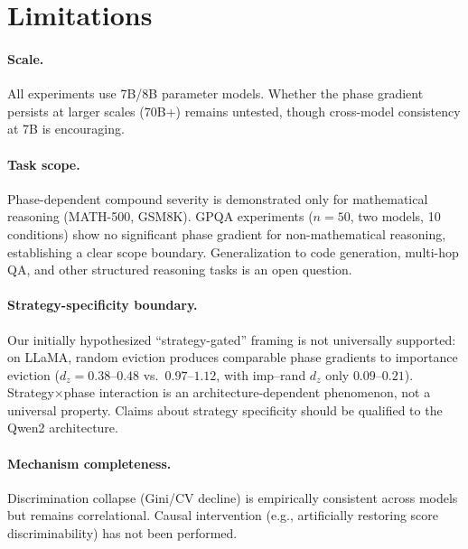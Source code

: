 \documentclass[11pt,a4paper]{article}
\begin{document}
\section*{Limitations}

\paragraph{Scale.} All experiments use 7B/8B parameter models. Whether the phase gradient persists at larger scales (70B+) remains untested, though cross-model consistency at 7B is encouraging.

\paragraph{Task scope.} Phase-dependent compound severity is demonstrated only for mathematical reasoning (MATH-500, GSM8K). GPQA experiments ($n = 50$, two models, 10 conditions) show no significant phase gradient for non-mathematical reasoning, establishing a clear scope boundary. Generalization to code generation, multi-hop QA, and other structured reasoning tasks is an open question.

\paragraph{Strategy-specificity boundary.} Our initially hypothesized ``strategy-gated'' framing is not universally supported: on LLaMA, random eviction produces comparable phase gradients to importance eviction ($d_z = 0.38$--$0.48$ vs.\ $0.97$--$1.12$, with imp--rand $d_z$ only $0.09$--$0.21$). Strategy$\times$phase interaction is an architecture-dependent phenomenon, not a universal property. Claims about strategy specificity should be qualified to the Qwen2 architecture.

\paragraph{Mechanism completeness.} Discrimination collapse (Gini/CV decline) is empirically consistent across models but remains correlational. Causal intervention (e.g., artificially restoring score discriminability) has not been performed.
\end{document}
